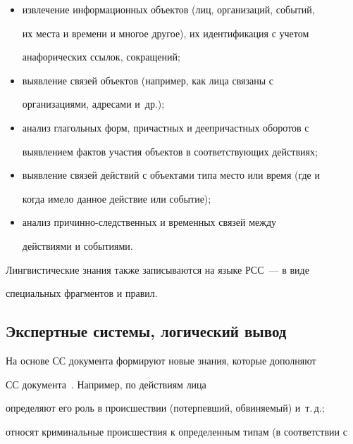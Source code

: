     \begin{itemize}


    \item извлечение информационных объектов (лиц, организаций, событий, 


их места и времени и многое другое), их идентификация с учетом 


анафорических ссылок, сокращений;


    \item выявление связей объектов (например, как лица связаны с 


организациями, адресами и~др.);


    \item анализ глагольных форм, причастных и деепричастных оборотов с 


выявлением фактов участия объектов в соответствующих действиях;


    \item выявление связей действий с объектами типа место или время (где и 


когда имело данное действие или событие);


    \item анализ причинно-следственных и временных связей между 


действиями и событиями.


    \end{itemize}


    


    Лингвистические знания также записываются на языке РСС~--- в виде 


специальных фрагментов и правил.


    


    \subsection{Экспертные системы, логический вывод}


    


    На основе СС документа формируют новые знания, которые дополняют 


СС документа~\cite{1-kuz, 8-kuz, 9-kuz}. Например, по действиям лица 


определяют его роль в происшествии (потерпевший, обвиняемый) и~т.\,д.; 


относят криминальные про\-ис\-шест\-вия к определенным типам (в соответствии с 


